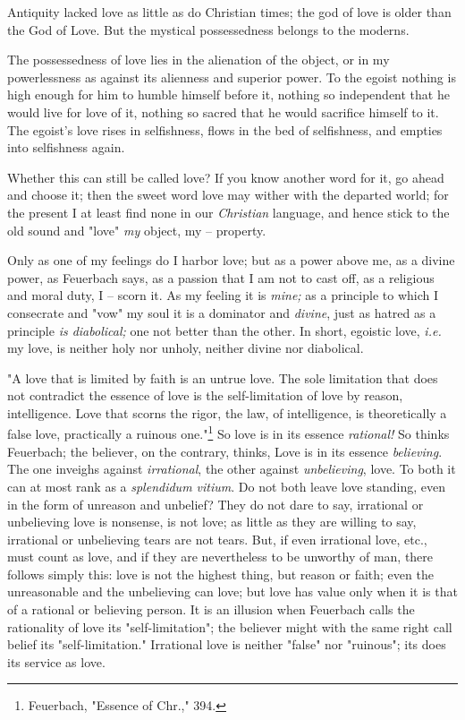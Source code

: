 \documentclass[a4paper]{book}
\begin{document}
Antiquity lacked love as little as do Christian times; the god of love is 
older than the God of Love. But the mystical possessedness belongs to the 
moderns.

The possessedness of love lies in the alienation of the object, or in my 
powerlessness as against its alienness and superior power. To the egoist 
nothing is high enough for him to humble himself before it, nothing so 
independent that he would live for love of it, nothing so sacred that he would 
sacrifice himself to it. The egoist's love rises in selfishness, flows in the 
bed of selfishness, and empties into selfishness again.

Whether this can still be called love? If you know another word for it, go 
ahead and choose it; then the sweet word love may wither with the departed 
world; for the present I at least find none in our \textit{Christian} 
language, and hence stick to the old sound and "{}love"{} \textit{my} object, 
my -- property.

Only as one of my feelings do I harbor love; but as a power above me, as a 
divine power, as Feuerbach says, as a passion that I am not to cast off, as a 
religious and moral duty, I -- scorn it. As my feeling it is \textit{mine;} as 
a principle to which I consecrate and "{}vow"{} my soul it is a dominator and 
\textit{divine}, just as hatred as a principle \textit{is diabolical;} one not 
better than the other. In short, egoistic love, \textit{i.e.} my love, is 
neither holy nor unholy, neither divine nor diabolical.

"{}A love that is limited by faith is an untrue love. The sole limitation that 
does not contradict the essence of love is the self-limitation of love by 
reason, intelligence. Love that scorns the rigor, the law, of intelligence, is 
theoretically a false love, practically a ruinous one."{}\footnote{Feuerbach, 
"{}Essence of Chr.,"{} 394.} So love is in its essence \textit{rational!} So 
thinks Feuerbach; the believer, on the contrary, thinks, Love is in its 
essence \textit{believing}. The one inveighs against \textit{irrational}, the 
other against \textit{unbelieving}, love. To both it can at most rank as a 
\textit{splendidum vitium}. Do not both leave love standing, even in the form 
of unreason and unbelief? They do not dare to say, irrational or unbelieving 
love is nonsense, is not love; as little as they are willing to say, 
irrational or unbelieving tears are not tears. But, if even irrational love, 
etc., must count as love, and if they are nevertheless to be unworthy of man, 
there follows simply this: love is not the highest thing, but reason or faith; 
even the unreasonable and the unbelieving can love; but love has value only 
when it is that of a rational or believing person. It is an illusion when 
Feuerbach calls the rationality of love its "{}self-limitation"{}; the 
believer might with the same right call belief its "{}self-limitation."{} 
Irrational love is neither "{}false"{} nor "{}ruinous"{}; its does its service 
as love.
\end{document}
